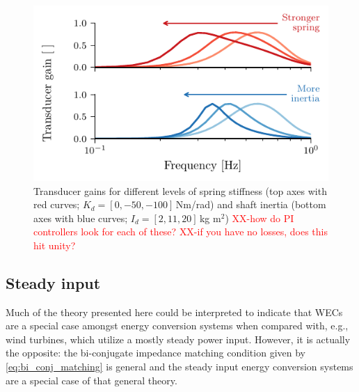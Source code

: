 \documentclass[lettersize,journal]{IEEEtran}
\newcommand{\rc}[1]{\textcolor{red}{#1}}
\begin{document}
\begin{figure}[tb]
        \centering
        \includegraphics[width=1\columnwidth]{wec_as_multiport_spring_inertia_transducer_gains.pdf}
        \caption{Transducer gains for different levels of spring stiffness (top axes with red curves; $K_d=[0, -50, -100]$\,Nm/rad) and shaft inertia (bottom axes with blue curves; $I_d=[2, 11, 20]$\,kg m$^2$) \rc{XX-how do PI controllers look for each of these?} \rc{XX-if you have no losses, does this hit unity?}}
        \label{fig:wec_as_multiport_spring_inertia_transducer_gains}
\end{figure}

\subsection{Steady input}\label{sec:steady_input}
Much of the theory presented here could be interpreted to indicate that WECs are a special case amongst energy conversion systems when compared with, e.g., wind turbines, which utilize a mostly steady power input.
However, it is actually the opposite: the bi-conjugate impedance matching condition given by \eqref{eq:bi_conj_matching} is general and the steady input energy conversion systems are a special case of that general theory.


\end{document}
